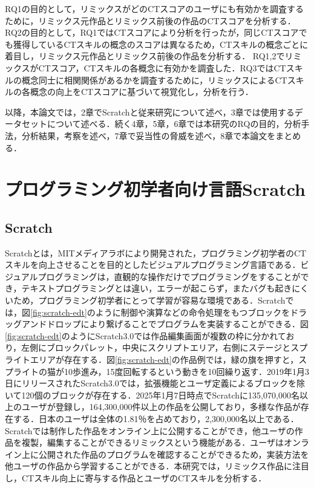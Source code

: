 \documentclass[11pt]{jreport}
\begin{document}
RQ1の目的として，リミックスがどのCTスコアのユーザにも有効かを調査するために，リミックス元作品とリミックス前後の作品のCTスコアを分析する．
RQ2の目的として，RQ1ではCTスコアにより分析を行ったが，同じCTスコアでも獲得しているCTスキルの概念のスコアは異なるため，CTスキルの概念ごとに着目し，リミックス元作品とリミックス前後の作品を分析する．
RQ1,2でリミックスがCTスコア，CTスキルの各概念に有効かを調査した．RQ3ではCTスキルの概念同士に相関関係があるかを調査するために，リミックスによるCTスキルの各概念の向上をCTスコアに基づいて視覚化し，分析を行う．

以降，本論文では，2章でScratchと従来研究について述べ，3章では使用するデータセットについて述べる．続く4章，5章，6章では本研究のRQの目的，分析手法，分析結果，考察を述べ，7章で妥当性の脅威を述べ，8章で本論文をまとめる．


\chapter{プログラミング初学者向け言語Scratch}\label{chap:fig-tab-exp}

\section{Scratch}
Scratchとは，MITメディアラボにより開発された，プログラミング初学者のCTスキルを向上させることを目的としたビジュアルプログラミング言語である\cite{resnick2009scratch}．ビジュアルプログラミングは，直観的な操作だけでプログラミングをすることができ，テキストプログラミングとは違い，エラーが起こらず，またバグも起きにくいため，プログラミング初学者にとって学習が容易な環境である．Scratchでは，図\ref{fig:scratch-edt}のように制御や演算などの命令処理をもつブロックをドラッグアンドドロップにより繋げることでプログラムを実装することができる．図\ref{fig:scratch-edt}のようにScratch3.0では作品編集画面が複数の枠に分かれており，左側にブロックパレット，中央にスクリプトエリア，右側にステージとスプライトエリアが存在する．図\ref{fig:scratch-edt}の作品例では，緑の旗を押すと，スプライトの猫が10歩進み，15度回転するという動きを10回繰り返す．2019年1月3日にリリースされたScratch3.0では，拡張機能とユーザ定義によるブロックを除いて120個のブロックが存在する．2025年1月7日時点でScratchに135,070,000名以上のユーザが登録し，164,300,000件以上の作品を公開しており，多様な作品が存在する．日本のユーザは全体の1.81％を占めており，2,300,000名以上である．Scratchでは制作した作品をオンライン上に公開することができ，他ユーザの作品を複製，編集することができるリミックスという機能がある．ユーザはオンライン上に公開された作品のプログラムを確認することができるため，実装方法を他ユーザの作品から学習することができる．本研究では，リミックス作品に注目し，CTスキル向上に寄与する作品とユーザのCTスキルを分析する．
\end{document}
